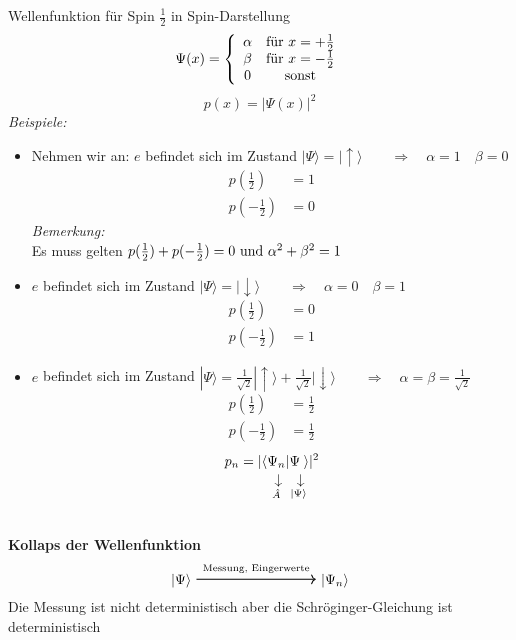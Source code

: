 Wellenfunktion für Spin $ \frac{1}{2} $ in Spin-Darstellung
\begin{equation*}
\Psi (x) = \left\{ \begin{array}{cc}
\alpha & \textrm{für } x = + \frac{1}{2} \\
\beta & \textrm{für } x = - \frac{1}{2} \\
0 & \textrm{sonst}
\end{array} \right.
\end{equation*}
\begin{equation*}
p(x) = | \Psi(x) |^2
\end{equation*}
\emph{Beispiele:}
\begin{itemize}
	\item Nehmen wir an: $ e $ befindet sich im Zustand $ | \Psi \rangle = | \uparrow \rangle \qquad \Rightarrow \quad \alpha = 1 \quad \beta = 0 $
	\begin{align*}
	p(\frac{1}{2}) &= 1 \\
	p(-\frac{1}{2}) &= 0
	\end{align*}
	\emph{Bemerkung:}\\
	Es muss gelten $ p(\frac{1}{2}) + p(-\frac{1}{2}) = 0 \textrm{ und } \alpha^2 + \beta^2 = 1 $
	\item $ e $ befindet sich im Zustand $ |\Psi \rangle = | \downarrow \rangle \qquad \Rightarrow \quad \alpha = 0 \quad \beta = 1 $
	\begin{align*}
	p(\frac{1}{2}) &= 0 \\
	p(-\frac{1}{2}) &= 1
	\end{align*}
	\item $ e $ befindet sich im Zustand $ |\Psi \rangle = \frac{1}{\sqrt{2}} | \uparrow \rangle + \frac{1}{\sqrt{2}} | \downarrow \rangle \qquad \Rightarrow \quad \alpha = \beta = \frac{1}{\sqrt{2}} $
	\begin{align*}
	p(\frac{1}{2}) &= \frac{1}{2} \\
	p(-\frac{1}{2}) &= \frac{1}{2}
	\end{align*}
	\begin{equation*}
	p_n = | \langle \custo{\rightarrow}{\Psi_n}{\hat{A}} | \custo{\rightarrow}{\Psi_{\phantom{n}}}{|\Psi \rangle} \hspace{-3pt} \rangle | ^2
	\end{equation*}
\end{itemize}
\\[5pt]
\textbf{Kollaps der Wellenfunktion}
\begin{equation*}
| \Psi \rangle \ \overset{\tx{Messung, Eingerwerte}}{\begin{tikzpicture}
	\draw[thick,->] (0,0) -- (3,0);
	\end{tikzpicture}} \ | \Psi_n \rangle
\end{equation*}
Die Messung ist nicht deterministisch aber die Schröginger-Gleichung ist deterministisch \Huge{\lightning} \normalsize

